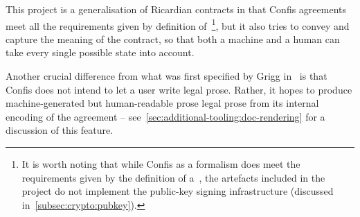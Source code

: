 This project is a generalisation of Ricardian contracts in that Confis agreements meet all the requirements given by definition of~\footnote{It is worth noting that while Confis as a formalism does meet the requirements given by the definition of a~, the artefacts included in the project do not implement the public-key signing infrastructure (discussed in~\autoref{subsec:crypto:pubkey}).}, but it also tries to convey and capture the meaning of the contract, so that both a machine and a human can take every single possible state into account.

Another crucial difference from what was first specified by Grigg in~\cite{grigg2004ricardian} is that Confis does not intend to let a user write legal prose.
Rather, it hopes to produce machine-generated but human-readable prose legal prose from its internal encoding of the agreement -- see~\autoref{sec:additional-tooling:doc-rendering} for a discussion of this feature.
